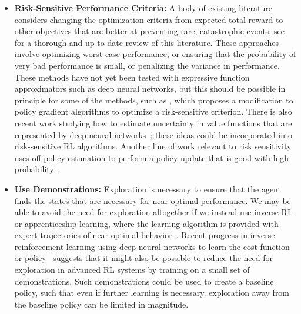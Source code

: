 \documentclass[a4paper,10pt]{article}
\begin{document}
\begin{itemize}

\item {\bf Risk-Sensitive Performance Criteria:} A body of existing literature considers changing the optimization criteria from expected total reward to other objectives that are better at preventing rare, catastrophic events; see \cite{garcia2015comprehensive} for a thorough and up-to-date review of this literature. These approaches involve optimizing worst-case performance, or ensuring that the probability of very bad performance is small, or penalizing the variance in performance. These methods have not yet been tested with expressive function approximators such as deep neural networks, but this should be possible in principle for some of the methods, such as \cite{tamar2014policy}, which proposes a modification to policy gradient algorithms to optimize a risk-sensitive criterion. There is also recent work studying how to estimate uncertainty in value functions that are represented by deep neural networks~\cite{osband2016deep,gal2015dropout}; these ideas could be incorporated into risk-sensitive RL algorithms. Another line of work relevant to risk sensitivity uses off-policy estimation to perform a policy update that is good with high probability~\cite{thomas2015high}. 

\item {\bf Use Demonstrations:} Exploration is necessary to ensure that the agent finds the states that are necessary for near-optimal performance. We may be able to avoid the need for exploration altogether if we instead use inverse RL or apprenticeship learning, where the learning algorithm is provided with expert trajectories of near-optimal behavior~\cite{ross2010reduction,abbeel2005exploration}. Recent progress in inverse reinforcement learning using deep neural networks to learn the cost function or policy~\cite{finn2016guided} suggests that it might also be possible to reduce the need for exploration in advanced RL systems by training on a small set of demonstrations.  Such demonstrations could be used to create a baseline policy, such that even if further learning is necessary, exploration away from the baseline policy can be limited in magnitude.


\end{itemize}
\end{document}
